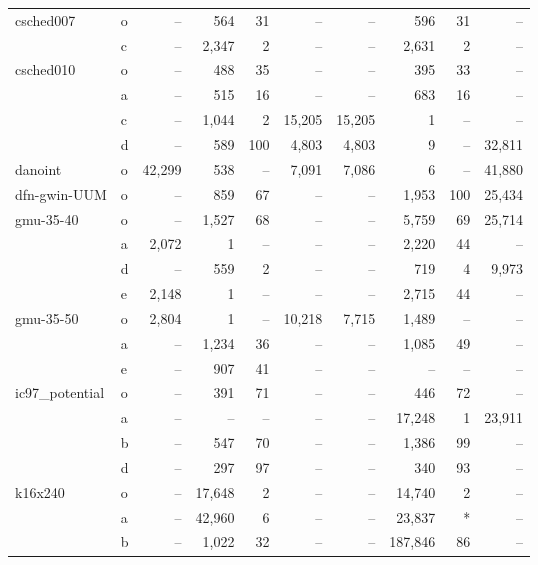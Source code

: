 \documentclass[11.5pt]{article}
\begin{document}
\begin{table}[H]
\begin{tabular}{l|l|rrr|rrrr|r}
csched007         & o & --    & 564   & 31 & --     & --    & 596   & 31   & -- \\
                  & c & --    & 2,347 & 2  & --     & --    & 2,631 & 2    & -- \\
csched010         & o & --    & 488   & 35 & --     & --    & 395   & 33   & --\\
                  & a & --    & 515   & 16 & --     & --    & 683   & 16   & --\\
                  & c & --    & 1,044 & 2  & 15,205 & 15,205& 1     & --   & --\\
                  & d & --    & 589   & 100& 4,803  & 4,803 & 9     & --   & 32,811\\
danoint           & o & 42,299& 538   & -- & 7,091  & 7,086 & 6     & --   & 41,880\\
dfn-gwin-UUM      & o & --    & 859   & 67 & --     & --    & 1,953 & 100  & 25,434 \\
gmu-35-40         & o & --    & 1,527 & 68 & --     & --    & 5,759 & 69   & 25,714\\
                  & a & 2,072 & 1     & -- & --     & --    & 2,220 & 44   & --\\
                  & d & --    & 559   & 2  & --     & --    & 719   & 4    & 9,973\\
                  & e & 2,148 & 1     & -- & --     & --    & 2,715 & 44   & --\\
gmu-35-50         & o & 2,804 & 1     & -- & 10,218 & 7,715 & 1,489 & --   & --\\
                  & a & --    & 1,234 & 36 & --     & --    & 1,085 & 49   & --\\
                  & e & --    & 907   & 41 & --     & --    & --    & --   & --\\
ic97\_potential   & o & --    & 391   & 71 & --     & --    & 446   & 72   & --\\
                  & a & --    & --    & -- & --     & --    & 17,248& 1    & 23,911\\
                  & b & --    & 547   & 70 & --     & --    & 1,386 & 99   & --\\
                  & d & --    & 297   & 97 & --     & --    & 340   & 93   & --\\
k16x240           & o & --    & 17,648& 2  & --     & --    & 14,740& 2    & --\\
                  & a & --    & 42,960& 6  & --     & --    & 23,837& *    & --\\
                  & b & --    & 1,022 & 32 & --     & --    &187,846& 86   & --\\

\end{tabular}
\end{table}
\end{document}

